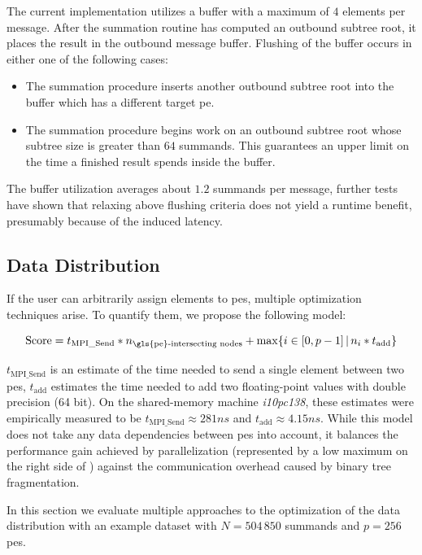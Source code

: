 The current implementation utilizes a buffer with a maximum of $4$ elements per message.
After the summation routine has computed an outbound subtree root, it places the result in the outbound message buffer.
Flushing of the buffer occurs in either one of the following cases: \begin{itemize} 
\item The summation procedure inserts another outbound subtree root into the buffer which has a different target \gls{pe}.
\item The summation procedure begins work on an outbound subtree root whose subtree size is greater than $64$ summands. This guarantees an upper limit on the time a finished result spends inside the buffer.
\end{itemize}

The buffer utilization averages about $1.2$ summands per message, further tests have shown that relaxing above flushing criteria does not yield a runtime benefit, presumably because of the induced latency.

\subsection{Data Distribution}
\label{sec:DataDistribution}

If the user can arbitrarily assign elements to \glspl{pe}, multiple optimization techniques arise. To quantify them, we propose the following model:

\begin{equation}
\label{eq:distributionScore}
\textrm{Score} = t_{\textrm{MPI\_Send}} * n_{\textrm{\gls{pe}-intersecting nodes}} + \max \{ i \in [0, p - 1]\, |\, n_i * t_{\textrm{add}} \}
\end{equation}

$t_{\textrm{MPI\_Send}}$ is an estimate of the time needed to send a single element between two \glspl{pe}, $t_\textrm{add}$ estimates the time needed to add two floating-point values with double precision (64 bit).
On the shared-memory machine \textit{i10pc138}, these estimates were empirically measured to be $t_{\textrm{MPI\_Send}} \approx 281ns$ and $t_\textrm{add} \approx 4.15ns$.
While this model does not take any data dependencies between \glspl{pe} into account, it balances the performance gain achieved by parallelization (represented by a low maximum on the right side of ) against the communication overhead caused by binary tree fragmentation. 

In this section we evaluate multiple approaches to the optimization of the data distribution with an example dataset with $N = 504\,850$ summands and $p = 256$ \glspl{pe}.

